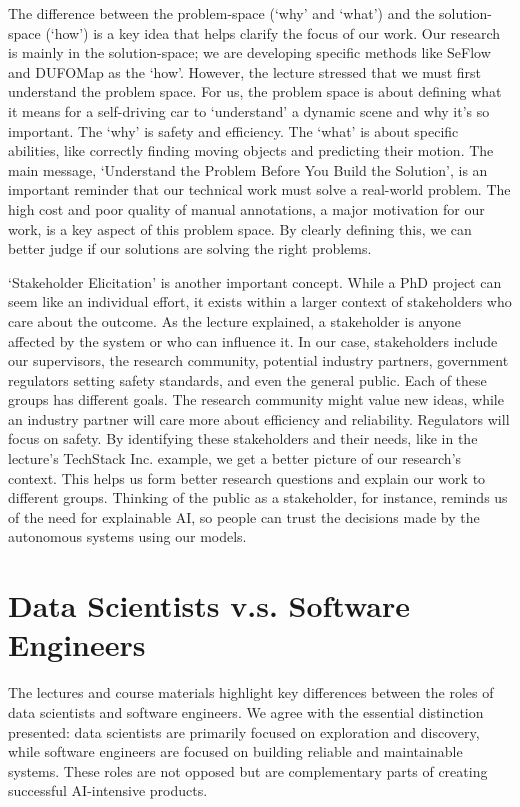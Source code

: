 \documentclass{article}
\begin{document}
The difference between the problem-space (`why' and `what') and the solution-space (`how') is a key idea that helps clarify the focus of our work. 
Our research is mainly in the solution-space; we are developing specific methods like SeFlow and DUFOMap as the `how'. 
However, the lecture stressed that we must first understand the problem space. For us, the problem space is about defining what it means for a self-driving car to `understand' a dynamic scene and why it's so important. 
The `why' is safety and efficiency. 
The `what' is about specific abilities, like correctly finding moving objects and predicting their motion. 
The main message, `Understand the Problem Before You Build the Solution', is an important reminder that our technical work must solve a real-world problem. The high cost and poor quality of manual annotations, a major motivation for our work, is a key aspect of this problem space. By clearly defining this, we can better judge if our solutions are solving the right problems.

`Stakeholder Elicitation' is another important concept. While a PhD project can seem like an individual effort, it exists within a larger context of stakeholders who care about the outcome. 
As the lecture explained, a stakeholder is anyone affected by the system or who can influence it. 
In our case, stakeholders include our supervisors, the research community, potential industry partners, government regulators setting safety standards, and even the general public. Each of these groups has different goals. 
The research community might value new ideas, while an industry partner will care more about efficiency and reliability. 
Regulators will focus on safety. By identifying these stakeholders and their needs, like in the lecture's TechStack Inc. example, we get a better picture of our research's context. 
This helps us form better research questions and explain our work to different groups. Thinking of the public as a stakeholder, for instance, reminds us of the need for explainable AI, so people can trust the decisions made by the autonomous systems using our models.

\section{Data Scientists v.s. Software Engineers}
The lectures and course materials highlight key differences between the roles of data scientists and software engineers. We agree with the essential distinction presented: data scientists are primarily focused on exploration and discovery, while software engineers are focused on building reliable and maintainable systems. These roles are not opposed but are complementary parts of creating successful AI-intensive products.
\end{document}
